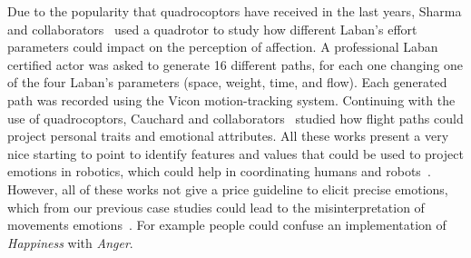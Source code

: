Due to the popularity that quadrocoptors have received in the last years, Sharma and collaborators~\cite{Sharma2013} used a quadrotor to study how different Laban's effort~\cite{Laban1968} parameters could impact on the perception of affection. A professional Laban certified actor was asked to generate 16 different paths, for each one changing one of the four Laban's parameters (space, weight, time, and flow). Each generated path was recorded using the Vicon motion-tracking system. Continuing with the use of quadrocoptors, Cauchard and collaborators~\cite{Cauchard2016} studied how flight paths could project personal traits and emotional attributes. All these works present a very nice starting to point to identify features and values that could be used to project emotions in robotics, which could help in coordinating humans and robots~\cite{Novika2015}. However, all of these works not give a price guideline to elicit precise emotions, which from our previous case studies could lead to the misinterpretation of movements emotions~\cite{Angel2016}. For example people could confuse an implementation of \textit{Happiness} with \textit{Anger}.
